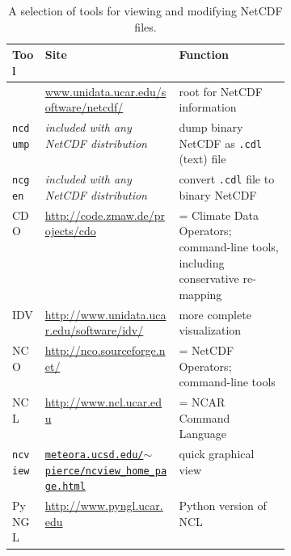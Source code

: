 \newcommand{\netcdftool}[1]{#1\index{NetCDF!tools!#1}}
\begin{table}[ht]
\centering
\small
\begin{tabular}{llp{0.4\linewidth}}
  \toprule
  \textbf{Tool} & \textbf{Site} & \textbf{Function} \\
  \midrule
  & \url{www.unidata.ucar.edu/software/netcdf/} & root for NetCDF information \\
  \midrule
  \netcdftool{\texttt{ncdump}} & \emph{included with any NetCDF distribution} & dump binary NetCDF as \texttt{.cdl} (text) file \\
  \netcdftool{\texttt{ncgen}} & \emph{included with any NetCDF distribution} & convert \texttt{.cdl} file to binary NetCDF \\
  \midrule
  \netcdftool{CDO} & \url{http://code.zmaw.de/projects/cdo} & = Climate Data Operators; command-line tools, including conservative re-mapping \\
  \netcdftool{IDV} & \url{http://www.unidata.ucar.edu/software/idv/} & more complete visualization \\
  \netcdftool{NCO}\index{NCO (NetCDF Operators)} & \url{http://nco.sourceforge.net/} & = NetCDF Operators; command-line tools\\
  \netcdftool{NCL} &  \url{http://www.ncl.ucar.edu} & = NCAR Command Language\\
  \netcdftool{\texttt{ncview}} & \href{http://meteora.ucsd.edu/~pierce/ncview_home_page.html}{\texttt{meteora.ucsd.edu/$\sim$pierce/ncview_home_page.html}} & quick graphical view \\
  \netcdftool{PyNGL} &  \url{http://www.pyngl.ucar.edu} & Python version of NCL\\
  \bottomrule
\end{tabular}
\normalsize
\caption{A selection of tools for viewing and modifying NetCDF files.}
\label{tab:NetCDFview}
\end{table}





